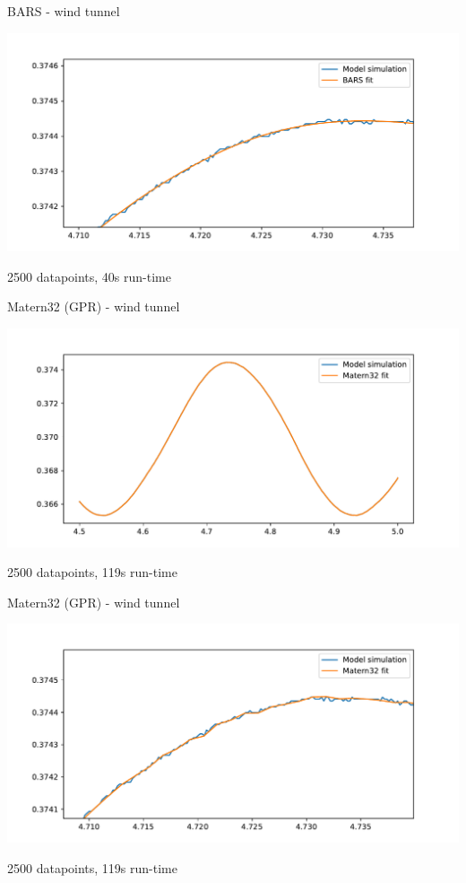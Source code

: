 \documentclass[presentation]{beamer}
\begin{document}
\begin{frame}[label={sec:org6e62813}]{BARS - wind tunnel}
\begin{center}
\includegraphics[width=.9\linewidth]{./bars_zoom.pdf}
\end{center}

2500 datapoints, 40s run-time
\end{frame}

\begin{frame}[label={sec:orge4b0e07}]{Matern32 (GPR) - wind tunnel}
\begin{center}
\includegraphics[width=.9\linewidth]{./matern32section.pdf}
\end{center}

2500 datapoints, 119s run-time
\end{frame}

\begin{frame}[label={sec:org624ca13}]{Matern32 (GPR) - wind tunnel}
\begin{center}
\includegraphics[width=.9\linewidth]{./matern32zoom.pdf}
\end{center}

2500 datapoints, 119s run-time
\end{frame}
\end{document}

